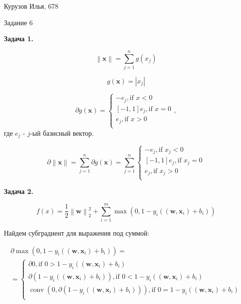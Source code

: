 \documentclass[12pt]{article}
\DeclareMathOperator*{\conv}{conv}
\newcommand\norm[1]{\left\lVert#1\right\rVert}
\begin{document}
\begin{center}
	{Курузов Илья, 678}

	{Задание 6}
\end{center}

\begin{center}
	\textbf{Задача 1.}
\end{center}

$$\norm{\textbf{x}} = \sum\limits_{j=1}^n g(x_j)$$

$$g(\textbf{x}) = |x_j|$$

\begin{equation}
\partial g(\textbf{x}) = 
\begin{cases}
-e_j, \text{if $x < 0$} \\
[-1, 1]e_j, \text{if $x = 0$} \\
e_j, \text{if $x > 0$} \\
\end{cases},
\end{equation}
где $e_j$ - $j$-ый базисный вектор.

\begin{equation}
\partial\norm{\textbf{x}} = \sum\limits_{j=1}^n \partial g(\textbf{x}) =
\sum\limits_{j=1}^n
\begin{cases}
-e_j, \text{if $x_j < 0$} \\
[-1, 1]e_j, \text{if $x_j = 0$} \\
e_j, \text{if $x_j > 0$} \\
\end{cases} 
\end{equation}

\begin{center}
	\textbf{Задача 2.}
\end{center}


\begin{equation}
f(x) = \frac{1}{2}\norm{\textbf{w}}_2^2 + \sum\limits_{i=1}^m \max \left(0, 1-y_i((\textbf{w},\textbf{x}_i) + b_i)\right)
\end{equation}

Найдем субградиент для выражения под суммой:

\begin{eqnarray}
\partial \max \left(0, 1-y_i((\textbf{w},\textbf{x}_i) + b_i)\right) =\nonumber\\
=\begin{cases}
\partial 0, \text{if $0 > 1-y_i((\textbf{w},\textbf{x}_i) + b_i)$} \\
\partial \left(1-y_i((\textbf{w},\textbf{x}_i) + b_i)\right), \text{if $0 < 1-y_i((\textbf{w},\textbf{x}_i) + b_i)$} \\
\conv\left(0, \partial(1-y_i((\textbf{w},\textbf{x}_i) + b_i))\right), \text{if $0 = 1-y_i((\textbf{w},\textbf{x}_i) + b_i)$} \\
\end{cases}
\end{eqnarray}
\end{document}
